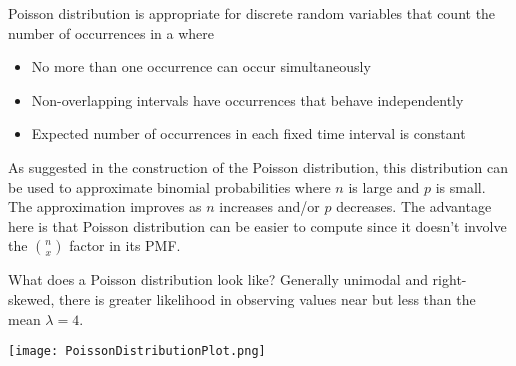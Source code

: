 Poisson distribution is appropriate for discrete random variables that count the number of occurrences in a  where

\begin{itemize}
    \item No more than one occurrence can occur simultaneously 
    \item Non-overlapping intervals have occurrences that behave independently 
    \item Expected number of occurrences in each fixed time interval is constant
\end{itemize}

As suggested in the construction of the Poisson distribution, this distribution can be used to approximate binomial probabilities where $n$ is large and $p$ is small. The approximation improves as $n$ increases and/or $p$ decreases. The advantage here is that Poisson distribution can be easier to compute since it doesn't involve the $\binom{n}{x}$ factor in its PMF. 

What does a Poisson distribution look like? Generally unimodal and right-skewed, there is greater likelihood in observing values near but less than the mean $\lambda = 4$.

\begin{center} \texttt{[image: PoissonDistributionPlot.png]} \end{center}


